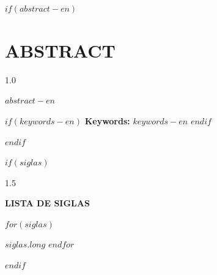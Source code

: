 \newpage
\pagestyle{fancy}

$if(abstract-en)$
\section*{ABSTRACT}

\begin{spacing}{1.0}
\justify

\setlength{\parindent}{0pt}

$abstract-en$

$if(keywords-en)$
\vspace{1em}
\textbf{Keywords:} $keywords-en$
$endif$

\setlength{\parindent}{15pt}
\end{spacing}

\newpage
\pagestyle{fancy}
$endif$

\renewcommand{\listfigurename}{LISTA DE FIGURAS}
\listoffigures

\newpage
\pagestyle{fancy}

\renewcommand{\listtablename}{LISTA DE TABELAS}
\listoftables

\newpage
\pagestyle{fancy}

$if(siglas)$
\begin{spacing}{1.5}
\begin{center}\textbf{LISTA DE SIGLAS}\end{center}
\vspace{1em}

\begin{list}{}{%
  \setlength{\labelwidth}{2.5cm}%
  \setlength{\labelsep}{0.5cm}%
  \setlength{\leftmargin}{3cm}%
  \setlength{\itemsep}{0pt}%
  \setlength{\parsep}{0pt}%
  \renewcommand{\makelabel}[1]{#1\hfill}%
}
$for(siglas)$\item[$siglas.short$] $siglas.long$
$endfor$
\end{list}
\end{spacing}

\newpage
$endif$

\renewcommand{\contentsname}{SUMÁRIO}
\tableofcontents


\newpage
{}
